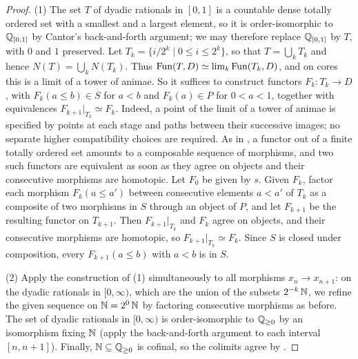 	\begin{proof}
		(1) The set $T$ of dyadic rationals in $[0,1]$ is a countable dense totally ordered set with a smallest and a largest element, so it is order-isomorphic to $\operatorname{\mathbb Q}_{[0,1]}$ by Cantor's back-and-forth argument; we may therefore replace $\operatorname{\mathbb Q}_{[0,1]}$ by $T$, with $0$ and $1$ preserved. Let $T_k = \{i/2^k \mid 0 \leq i \leq 2^k\}$, so that $T = \bigcup_k T_k$ and hence $N(T) = \bigcup_k N(T_k)$. Thus $\operatorname{Fun}(T,D) \simeq \operatorname{lim}_k \operatorname{Fun}(T_k,D)$, and on cores this is a limit of a tower of animae. So it suffices to construct functors $F_k\colon T_k \to D$, with $F_k(a \leq b) \in S$ for $a < b$ and $F_k(a) \in P$ for $0 < a < 1$, together with equivalences $F_{k+1}|_{T_k} \simeq F_k$. Indeed, a point of the limit of a tower of animae is specified by points at each stage and paths between their successive images; no separate higher compatibility choices are required. As in , a functor out of a finite totally ordered set amounts to a composable sequence of morphisms, and two such functors are equivalent as soon as they agree on objects and their consecutive morphisms are homotopic. Let $F_0$ be given by $s$. Given $F_k$, factor each morphism $F_k(a \leq a')$ between consecutive elements $a < a'$ of $T_k$ as a composite of two morphisms in $S$ through an object of $P$, and let $F_{k+1}$ be the resulting functor on $T_{k+1}$. Then $F_{k+1}|_{T_k}$ and $F_k$ agree on objects, and their consecutive morphisms are homotopic, so $F_{k+1}|_{T_k} \simeq F_k$. Since $S$ is closed under composition, every $F_{k+1}(a \leq b)$ with $a < b$ is in $S$.

		(2) Apply the construction of (1) simultaneously to all morphisms $x_n \to x_{n+1}$: on the dyadic rationals in $[0,\infty)$, which are the union of the subsets $2^{-k}\operatorname{\mathbb N}$, we refine the given sequence on $\operatorname{\mathbb N} = 2^{0}\operatorname{\mathbb N}$ by factoring consecutive morphisms as before. The set of dyadic rationals in $[0,\infty)$ is order-isomorphic to $\operatorname{\mathbb Q}_{\geq 0}$ by an isomorphism fixing $\operatorname{\mathbb N}$ (apply the back-and-forth argument to each interval $[n,n+1]$). Finally, $\operatorname{\mathbb N} \subseteq \operatorname{\mathbb Q}_{\geq 0}$ is cofinal, so the colimits agree by .
	\end{proof}

